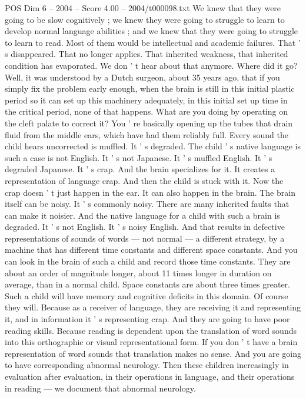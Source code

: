 \begin{textsample}{POS Dim 6 – 2004 – Score 4.00 – 2004/t000098.txt}
We knew that they were going to be slow cognitively ; we knew they were going to struggle to learn to develop normal language abilities ; and we knew that they were going to struggle to learn to read.
Most of them would be intellectual and academic failures.
That ' s disappeared.
That no longer applies.
That inherited weakness, that inherited condition has evaporated.
We don ' t hear about that anymore.
Where did it go?
Well, it was understood by a Dutch surgeon, about 35 years ago, that if you simply fix the problem early enough, when the brain is still in this initial plastic period so it can set up this machinery adequately, in this initial set up time in the critical period, none of that happens.
What are you doing by operating on the cleft palate to correct it?
You ' re basically opening up the tubes that drain fluid from the middle ears, which have had them reliably full.
Every sound the child hears uncorrected is muffled.
It ' s degraded.
The child ' s native language is such a case is not English.
It ' s not Japanese.
It ' s muffled English.
It ' s degraded Japanese.
It ' s crap.
And the brain specializes for it.
It creates a representation of language crap.
And then the child is stuck with it.
Now the crap doesn ' t just happen in the ear.
It can also happen in the brain.
The brain itself can be noisy.
It ' s commonly noisy.
There are many inherited faults that can make it noisier.
And the native language for a child with such a brain is degraded.
It ' s not English.
It ' s noisy English.
And that results in defective representations of sounds of words — not normal — a different strategy, by a machine that has different time constants and different space constants.
And you can look in the brain of such a child and record those time constants.
They are about an order of magnitude longer, about 11 times longer in duration on average, than in a normal child.
Space constants are about three times greater.
Such a child will have memory and cognitive deficits in this domain.
Of course they will.
Because as a receiver of language, they are receiving it and representing it, and in information it ' s representing crap.
And they are going to have poor reading skills.
Because reading is dependent upon the translation of word sounds into this orthographic or visual representational form.
If you don ' t have a brain representation of word sounds that translation makes no sense.
And you are going to have corresponding abnormal neurology.
Then these children increasingly in evaluation after evaluation, in their operations in language, and their operations in reading — we document that abnormal neurology.

\end{textsample}
